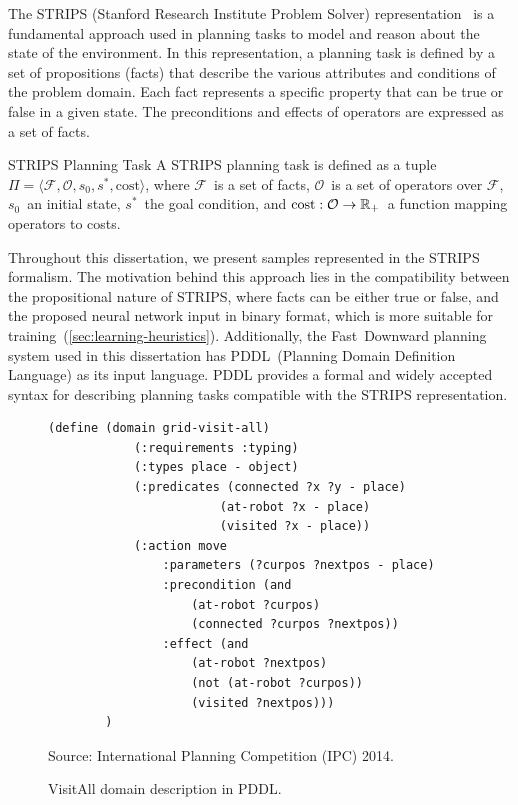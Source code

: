 The STRIPS (Stanford Research Institute Problem Solver) representation~\cite{fikes1971strips} is a fundamental approach used in planning tasks to model and reason about the state of the environment. In this representation, a planning task is defined by a set of propositions (facts) that describe the various attributes and conditions of the problem domain. Each fact represents a specific property that can be true or false in a given state. The preconditions and effects of operators are expressed as a set of facts.

\begin{definition}{STRIPS Planning Task}
    \label{def:strips}
    A STRIPS planning task is defined as a tuple~$\Pi=\langle\mathcal{F},\mathcal{O},s_0,s^*, \text{cost}\rangle$, where $\mathcal{F}$~is a set of facts, $\mathcal{O}$~is a set of operators over $\mathcal{F}$, $s_0$~an initial state, $s^*$~the goal condition, and $\text{cost}:\mathcal{O}\rightarrow\mathbb{R}_{+}$~a function mapping operators to costs.
\end{definition}

Throughout this dissertation, we present samples represented in the STRIPS formalism. The motivation behind this approach lies in the compatibility between the propositional nature of STRIPS, where facts can be either true or false, and the proposed neural network input in binary format, which is more suitable for training~(\cref{sec:learning-heuristics}). Additionally, the Fast~Downward planning system used in this dissertation has PDDL~(Planning Domain Definition Language) as its input language. PDDL provides a formal and widely accepted syntax for describing planning tasks compatible with the STRIPS representation.

\begin{figure}[tb]
    \caption{VisitAll domain description in PDDL.}
    \label{fig:pddl}
    \centering
    \begin{lstlisting}[basicstyle=\ttfamily]
        (define (domain grid-visit-all)
            (:requirements :typing)
            (:types place - object)
            (:predicates (connected ?x ?y - place)
                        (at-robot ?x - place)
                        (visited ?x - place))
            (:action move
                :parameters (?curpos ?nextpos - place)
                :precondition (and
                    (at-robot ?curpos)
                    (connected ?curpos ?nextpos))
                :effect (and 
                    (at-robot ?nextpos)
                    (not (at-robot ?curpos))
                    (visited ?nextpos)))
        )
    \end{lstlisting}
    Source: International Planning Competition (IPC) 2014.
\end{figure}

